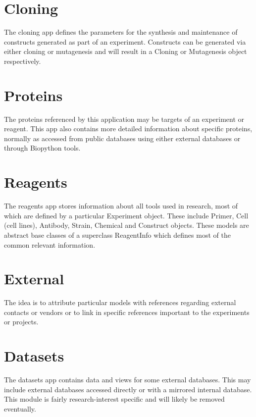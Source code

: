 \documentclass[letterpaper,10pt,english]{sphinxmanual}
\begin{document}
\section{Cloning}
\label{api:cloning}
The cloning app defines the parameters for the synthesis and maintenance of constructs generated as part of an experiment.  Constructs can be generated via either cloning or mutagenesis and will result in a Cloning or Mutagenesis object respectively.



\section{Proteins}
\label{api:proteins}
The proteins referenced by this application may be targets of an experiment or reagent.  This app also contains more detailed information about specific proteins, normally as accessed from public databases using either external databases or through Biopython tools.



\section{Reagents}
\label{api:reagents}
The reagents app stores information about all tools used in research, most of which are defined by a particular Experiment object.  These include Primer, Cell (cell lines), Antibody, Strain, Chemical and Construct objects.  These models are abstract base classes of a superclass ReagentInfo which defines most of the common relevant information.



\section{External}
\label{api:external}
The idea is to attribute particular models with references regarding external contacts or vendors or to link in specific references important to the experiments or projects.



\section{Datasets}
\label{api:datasets}
The datasets app contains data and views for some external databases.  This may include external databases accessed directly or with a mirrored internal database.  This module is fairly research-interest specific and will likely be removed eventually.
\end{document}

